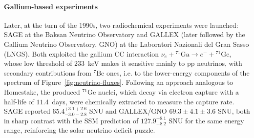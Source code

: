 \paragraph{Gallium-based experiments}
Later, at the turn of the 1990s, two radiochemical experiments were launched: SAGE at the Baksan Neutrino Observatory and GALLEX (later followed by the Gallium Neutrino Observatory, GNO) at the Laboratori Nazionali del Gran Sasso (LNGS). Both exploited the gallium \ac{CC} interaction $\nu_e + {}^{71}\text{Ga} \longrightarrow e^- + {}^{71}\text{Ge}$, whose low threshold of $233$~keV makes it sensitive mainly to \ac{pp} neutrinos, with secondary contributions from ${}^{7}\text{Be}$ ones, i.e. to the lower-energy components of the spectrum of Figure~\ref{fig:neutrino-fluxes}. Following an approach analogous to Homestake, the produced ${}^{71}\text{Ge}$ nuclei, which decay via electron capture with a half-life of $11.4$~days, were chemically extracted to measure the capture rate. SAGE reported $65.4^{+3.1+2.6}_{-3.0-2.8}$ SNU and GALLEX/GNO $69.3 \pm 4.1 \pm 3.6$ SNU, both in sharp contrast with the \ac{SSM} prediction of $127.9^{+8.1}_{-8.2}$ SNU for the same energy range, reinforcing the solar neutrino deficit puzzle.

